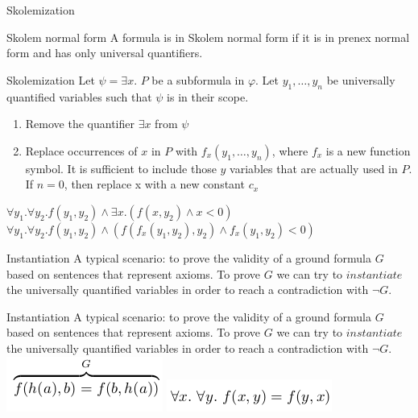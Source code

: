 \documentclass{beamer}
\begin{document}
\begin{frame}{Skolemization}
\begin{block}{Skolem normal form}
A formula is in Skolem normal form if it is in prenex normal form and has only universal quantifiers.
\end{block}
\begin{block}{Skolemization}
Let $\psi = \exists x$. $P$ be a subformula in $\varphi$. Let $y_1, \dots, y_n$ be universally quantified variables such that $\psi$ is
in their scope.
\begin{enumerate}
\item Remove the quantifier $\exists x$ from $\psi$
\item Replace occurrences of $x$ in $P$ with $f_x(y_1, \dots, y_n)$, where $f_x$ is a new function symbol. It is sufficient to include
those $y$ variables that are actually used in $P$. If $n = 0$, then replace x with a new constant $c_x$
\end{enumerate}
\end{block}
$\forall y_1.\forall y_2.f(y_1, y_2) \wedge \exists x.(f(x, y_2) \wedge x < 0)$\newline
$\forall y_1.\forall y_2.f(y_1, y_2) \wedge (f(f_x(y_1, y_2), y_2) \wedge f_x(y_1, y_2) < 0)$\newline
\end{frame}

\begin{frame}{Instantiation}
A typical scenario: to prove the validity of a ground formula $G$ based on sentences that represent axioms.\newline
To prove $G$ we can try to $instantiate$ the universally quantified variables in order to reach a contradiction with $\lnot G$.
\end{frame}

\begin{frame}{Instantiation}
A typical scenario: to prove the validity of a ground formula $G$ based on sentences that represent axioms.\newline
To prove $G$ we can try to $instantiate$ the universally quantified variables in order to reach a contradiction with $\lnot G$.
\includegraphics[scale=0.5]{ground.png}\newline
\includegraphics[scale=0.5]{axiom.png}\newline
\end{frame}
\end{document}
